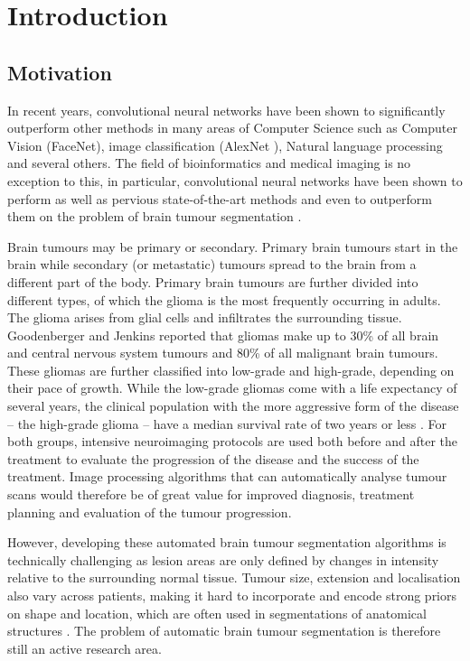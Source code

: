 \documentclass[12pt,a4paper,twoside,openright]{report}
\begin{document}

\pagestyle{headings}

\chapter{Introduction}
\section{Motivation}
In recent years, convolutional neural networks have been shown to significantly outperform other methods in many areas of Computer Science such as Computer Vision (FaceNet\cite{face_net}), image classification (AlexNet \cite{alex_net}), Natural language processing \cite{nlp_deep_learning} and several others. The field of bioinformatics and medical imaging is no exception to this, in particular, convolutional neural networks have been shown to perform as well as pervious \mbox{state-of-the-art} methods and even to outperform them on the problem of brain tumour segmentation \cite{pereira, kamnitas}.

Brain tumours may be primary or secondary. Primary brain tumours start in the brain while secondary (or metastatic) tumours spread to the brain from a different part of the body. Primary brain tumours are further divided into different types, of which the glioma is the most frequently occurring in adults. The  glioma arises from glial cells and infiltrates the surrounding tissue. Goodenberger and Jenkins \cite{gliomas_research} reported that gliomas make up to 30\% of all brain and central nervous system tumours and 80\% of all malignant brain tumours. These gliomas are further classified into low-grade and high-grade, depending on their pace of growth. While the low-grade gliomas come with a life expectancy of several years, the clinical population with the more aggressive form of the disease -- the high-grade glioma -- have a median survival rate of two years or less \cite{gliomas_life}. For both groups, intensive neuroimaging protocols are used both before and after the treatment to evaluate the progression of the disease and the success of the treatment. Image processing algorithms that can automatically analyse tumour scans would therefore be of great value for improved diagnosis, treatment planning and evaluation of the tumour progression. 

However, developing these automated brain tumour segmentation algorithms is technically challenging as lesion areas are only defined by changes in intensity relative to the surrounding normal tissue. Tumour size, extension and localisation also vary across patients, making it hard to incorporate and encode strong priors on shape and location, which are often used in segmentations of anatomical structures \cite{brats-proceedings}. The problem of automatic brain tumour segmentation is therefore still an active research area. 
\end{document}
